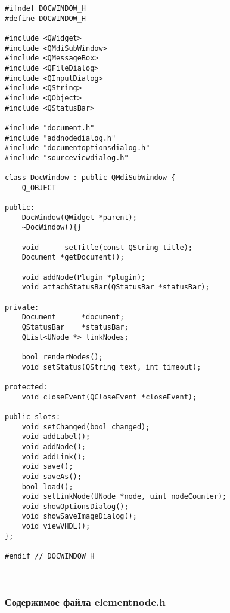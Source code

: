 \begin{lstlisting}
#ifndef DOCWINDOW_H
#define DOCWINDOW_H

#include <QWidget>
#include <QMdiSubWindow>
#include <QMessageBox>
#include <QFileDialog>
#include <QInputDialog>
#include <QString>
#include <QObject>
#include <QStatusBar>

#include "document.h"
#include "addnodedialog.h"
#include "documentoptionsdialog.h"
#include "sourceviewdialog.h"

class DocWindow : public QMdiSubWindow {
    Q_OBJECT

public:
    DocWindow(QWidget *parent);
    ~DocWindow(){}

    void      setTitle(const QString title);
    Document *getDocument();

    void addNode(Plugin *plugin);
    void attachStatusBar(QStatusBar *statusBar);

private:
    Document      *document;
    QStatusBar    *statusBar;
    QList<UNode *> linkNodes;

    bool renderNodes();
    void setStatus(QString text, int timeout);

protected:
    void closeEvent(QCloseEvent *closeEvent);

public slots:
    void setChanged(bool changed);
    void addLabel();
    void addNode();
    void addLink();
    void save();
    void saveAs();
    bool load();
    void setLinkNode(UNode *node, uint nodeCounter);
    void showOptionsDialog();
    void showSaveImageDialog();
    void viewVHDL();
};

#endif // DOCWINDOW_H
\end{lstlisting}~\\

\subsubsection*{Содержимое файла elementnode.h}

